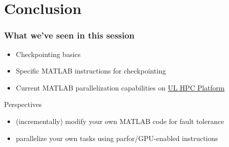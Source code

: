 \documentclass{beamer}
\newcommand{\ULHPC}{\href{http://hpc.uni.lu}{UL HPC Platform}\xspace}
\begin{document}
\section{Conclusion}
\begin{frame}
  \frametitle{What we've seen in this session}
   
    \begin{itemize}
      \item Checkpointing basics
      \item Specific MATLAB instructions for checkpointing
      \item Current MATLAB parallelization capabilities on \ULHPC
    \end{itemize}
 
     \begin{block}{Perspectives}
       \begin{itemize}
         \item (incrementally) modify your own MATLAB code for fault tolerance
         \item parallelize your own tasks using parfor/GPU-enabled instructions
       \end{itemize}
     \end{block}

\end{frame}


\end{document}
